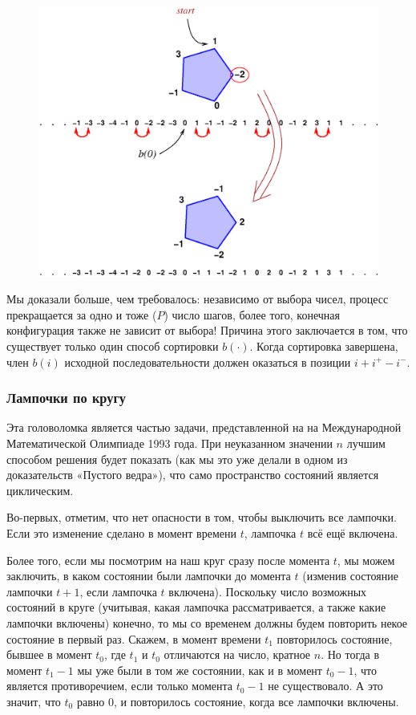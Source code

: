 \begin{figure}[h!]
\centering
\includegraphics[scale=0.5]{Figs/Algorithms/sort}
\end{figure}

Мы доказали больше, чем требовалось: независимо от выбора чисел, процесс прекращается за одно и тоже ($P$) число шагов, более того, конечная конфигурация также не зависит от выбора!
Причина этого заключается в том, что существует только один способ сортировки $b(\cdot)$.
Когда сортировка завершена, член $b(i)$ исходной последовательности должен оказаться в позиции $i + i^+ - i^-$.
\heart

\subsubsection*{Лампочки по кругу}%

Эта головоломка является частью задачи, представленной на на Международной Математической Олимпиаде 1993 года.
При неуказанном значении $n$ лучшим способом решения будет показать (как мы это уже делали в одном из доказательств «Пустого ведра»), что само пространство состояний является циклическим.

\medskip

Во-первых, отметим, что нет опасности в том, чтобы выключить все лампочки.
Если это изменение сделано в момент времени $t$, лампочка $t$ всё ещё включена.

Более того, если мы посмотрим на наш круг сразу после момента $t$, мы можем заключить, в каком состоянии были лампочки до момента $t$ (изменив состояние лампочки $t + 1$, если лампочка $t$ включена).
Поскольку число возможных состояний в круге (учитывая, какая лампочка рассматривается, а также какие лампочки включены) конечно, то мы со временем должны будем повторить некое состояние в первый раз.
Скажем, в момент времени $t_1$ повторилось состояние, бывшее в момент $t_0$, где $t_1$ и $t_0$ отличаются на число, кратное $n$.
Но тогда в момент $t_1 - 1$ мы уже были в том же состоянии, как и в момент $t_0 - 1$, что является противоречием, если только момента $t_0 - 1$ не существовало.
А это значит, что $t_0$ равно $0$, и повторилось состояние, когда все лампочки включены.
\heart

